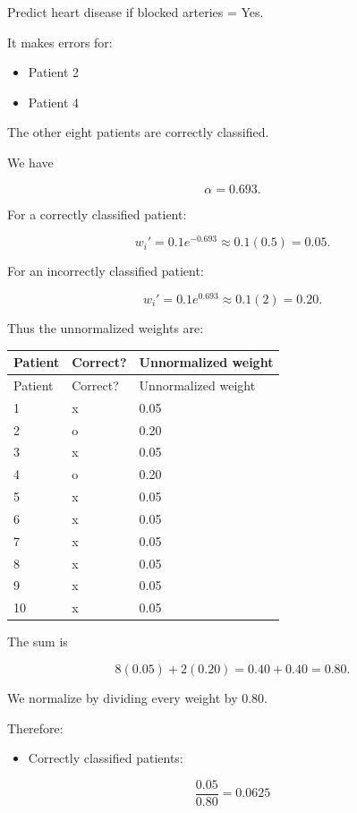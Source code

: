 \documentclass[10pt]{article}
\begin{document}
Predict heart disease if blocked arteries = Yes.

It makes errors for:

\begin{itemize}
\item
Patient 2

\item
Patient 4

\end{itemize}
The other eight patients are correctly classified.

We have

\[
\alpha=0.693.
\]

For a correctly classified patient:

\[
w_i'=0.1e^{-0.693}
\approx0.1(0.5)
={0.05}.
\]

For an incorrectly classified patient:

\[
w_i'=0.1e^{0.693}
\approx0.1(2)
={0.20}.
\]

Thus the unnormalized weights are:

\begingroup
\small
\setlength{\tabcolsep}{4pt}
\begin{longtable}{l|l|l}
Patient & Correct? & Unnormalized weight \\[1.5pt]
\hline
\endfirsthead
Patient & Correct? & Unnormalized weight \\[1.5pt]
\hline
\endhead
1 & x & 0.05 \\[1.5pt]
2 & o & 0.20 \\[1.5pt]
3 & x & 0.05 \\[1.5pt]
4 & o & 0.20 \\[1.5pt]
5 & x & 0.05 \\[1.5pt]
6 & x & 0.05 \\[1.5pt]
7 & x & 0.05 \\[1.5pt]
8 & x & 0.05 \\[1.5pt]
9 & x & 0.05 \\[1.5pt]
10 & x & 0.05 \\[1.5pt]
\end{longtable}
\endgroup
The sum is

\[
8(0.05)+2(0.20)
=0.40+0.40
=0.80.
\]

We normalize by dividing every weight by 0.80.

Therefore:

\begin{itemize}
\item
Correctly classified patients:

\end{itemize}
\[
\frac{0.05}{0.80}
={0.0625}
\]
\end{document}
